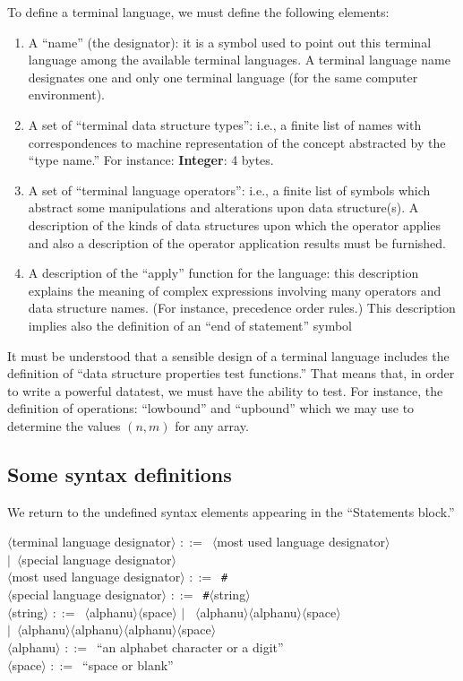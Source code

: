 \documentclass[openany,nobib]{tufte-book}
\newcommand{\sym}[1]{$\langle$#1$\rangle$}
\def\is{$::=$\ }
\def\alt{$|$\ }
\begin{document}
To define a terminal language, we must define the following elements:
\begin{enumerate}
    \item A ``name'' (the designator): it is a symbol used to point out this
terminal language among the available terminal languages. A terminal language
name designates one and only one terminal language (for the same computer
environment).
    \item A set of ``terminal data structure types'': i.e., a finite list of
names with correspondences to machine representation of the concept abstracted
by the ``type name.'' For instance: {\bf Integer}: 4 bytes.
    \item A set of ``terminal language operators'': i.e., a finite list of
symbols which abstract some manipulations and alterations upon data
structure(s). A description of the kinds of data structures upon which the
operator applies and also a description of the operator application results
must be furnished.
    \item A description of the ``apply'' function for the language: this
description explains the meaning of complex expressions involving many
operators and data structure names. (For instance, precedence order rules.)
This description implies also the definition of an ``end of statement'' symbol
\end{enumerate}

It must be understood that a sensible design of a terminal language includes
the definition of ``data structure properties test functions.'' That means
that, in order to write a powerful datatest, we must have the ability to test.
For instance, the definition of operations: ``lowbound'' and ``upbound'' which
we may use to determine the values $(n,m)$ for any array.

\subsection{Some syntax definitions}

We return to the undefined syntax elements appearing in the ``Statements
block.''

\begin{tcolorbox}
\sym{terminal language designator} \is \sym{most used language designator}\\
\qquad\alt \sym{special language designator}\\
\sym{most used language designator} \is {\tt\#}\\
\sym{special language designator} \is {\tt\#}\sym{string}\\
\sym{string} \is \sym{alphanu}\sym{space} \alt
\sym{alphanu}\sym{alphanu}\sym{space}\\
\qquad\alt \sym{alphanu}\sym{alphanu}\sym{alphanu}\sym{space}\\
\sym{alphanu} \is ``an alphabet character or a digit''\\
\sym{space} \is ``space or blank''
\end{tcolorbox}
\end{document}
